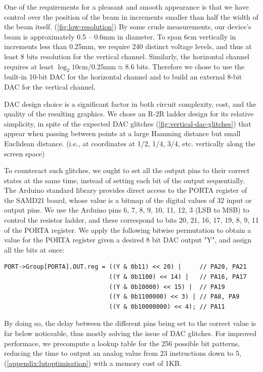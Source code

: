 \documentclass[12pt]{article}
\begin{document}
One of the requirements for a pleasant and smooth appearance is that we have control over the position of the beam in increments smaller than half the width of the beam itself. (\autoref{fig:low-resolution}) By some crude measurements, our device's beam is approximately 0.5 -- 0.6mm in diameter. To span 6cm vertically in increments less than 0.25mm, we require 240 distinct voltage levels, and thus at least 8 bits resolution for the vertical channel. Similarly, the horizontal channel requires at least \( \log_2{10\text{cm}/0.25\text{mm}} \approx 8.6 \) bits. Therefore we chose to use the built-in 10-bit DAC for the horizontal channel and to build an external 8-bit DAC for the vertical channel.

DAC design choice is a significant factor in both circuit complexity, cost, and the quality of the resulting graphics. We chose an R-2R ladder design for its relative simplicity, in spite of the expected DAC glitches (\autoref{fig:vertical-dac-glitches}) that appear when passing between points at a large Hamming distance but small Euclidean distance. (i.e., at coordinates at 1/2, 1/4, 3/4, etc. vertically along the screen space)

To counteract such glitches, we ought to set all the output pins to their correct states at the same time, instead of setting each bit of the output sequentially. The Arduino standard library provides direct access to the PORTA register of the SAMD21 board, whose value is a bitmap of the digital values of 32 input or output pins. We use the Arduino pins 6, 7, 8, 9, 10, 11, 12, 3 (LSB to MSB) to control the resistor ladder, and these correspond to bits 20, 21, 16, 17, 19, 8, 9, 11 of the PORTA register. We apply the following bitwise permutation to obtain a value for the PORTA register given a desired 8 bit DAC output "Y", and assign all the bits at once:

\begin{lstlisting}
PORT->Group[PORTA].OUT.reg = ((Y & 0b11) << 20) |     // PA20, PA21
                             ((Y & 0b1100) << 14) |   // PA16, PA17
                             ((Y & 0b10000) << 15) |  // PA19
                             ((Y & 0b1100000) << 3) | // PA8, PA9
                             ((Y & 0b10000000) << 4); // PA11         
\end{lstlisting}
\noindent By doing so, the delay between the different pins being set to the correct value is far below noticeable, thus mostly solving the issue of DAC glitches. For improved performace, we precompute a lookup table for the 256 possible bit patterns, reducing the time to output an analog value from 23 instructions down to 5, (\autoref{appendix:lutoptimisation}) with a memory cost of 1KB.
\end{document}
